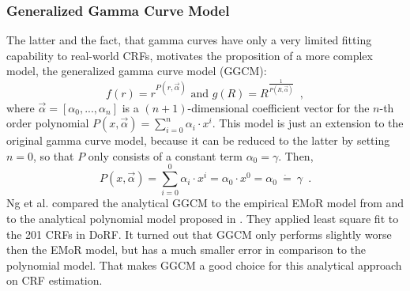 \subsubsection{Generalized Gamma Curve Model}
\label{subsubsec:ggcm}
The latter and the fact, that gamma curves have only a very limited fitting capability to real-world CRFs, motivates the proposition of a more complex model, the generalized gamma curve model (GGCM):
\begin{equation}
	f(r) = r^{P(r, \vec{\alpha})} \text{ and } g(R) = R^{\frac{1}{P(R, \vec{\alpha})}} \enspace ,
  \label{eq:ggcm}
\end{equation}
where $\vec{\alpha} = \left[\alpha_0,...,\alpha_n\right]$ is a $(n+1)$-dimensional coefficient vector for the $n$-th order polynomial $P(x,\vec{\alpha}) = \sum_{i=0}^n\alpha_i \cdot x^i$. This model is just an extension to the original gamma curve model, because it can be reduced to the latter by setting $n = 0$, so that $P$ only consists of a constant term $\alpha_0 = \gamma$. Then, 
\begin{equation}
	P(x, \vec{\alpha}) = \sum\limits_{i=0}^0\alpha_i \cdot x^i = \alpha_0 \cdot x^0 = \alpha_0\ \dot{=}\ \gamma \enspace .
	\label{eq:reducePtoconstant}
\end{equation}
Ng et \hbox{al.} compared the analytical GGCM to the empirical EMoR model from \cite{CAVE_0091} and to the analytical polynomial model proposed in \cite{CAVE_0068}. They applied least square fit to the 201 CRFs in DoRF. It turned out that GGCM only performs slightly worse then the EMoR model, but has a much smaller error in comparison to the polynomial model. That makes GGCM a good choice for this analytical approach on CRF estimation.


\clearpage

